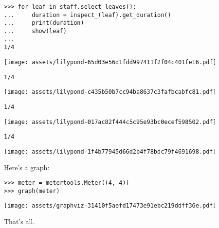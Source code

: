 \documentclass{article}
\begin{document}
\begin{lstlisting}
>>> for leaf in staff.select_leaves():
...     duration = inspect_(leaf).get_duration()
...     print(duration)
...     show(leaf)
...
1/4
\end{lstlisting}
\noindent\texttt{[image: assets/lilypond-65d03e56d1fdd997411f2f04c401fe16.pdf]}
\begin{lstlisting}
1/4
\end{lstlisting}
\noindent\texttt{[image: assets/lilypond-c435b50b7cc94ba8637c3fafbcabfc81.pdf]}
\begin{lstlisting}
1/4
\end{lstlisting}
\noindent\texttt{[image: assets/lilypond-017ac82f444c5c95e93bc0ecef598502.pdf]}
\begin{lstlisting}
1/4
\end{lstlisting}
\noindent\texttt{[image: assets/lilypond-1f4b77945d66d2b4f78bdc79f4691698.pdf]}

Here's a graph:

\begin{comment}
<abjad>
meter = metertools.Meter((4, 4))
graph(meter)
</abjad>
\end{comment}

\begin{lstlisting}
>>> meter = metertools.Meter((4, 4))
>>> graph(meter)
\end{lstlisting}
\noindent\texttt{[image: assets/graphviz-31410f5aefd17473e91ebc219ddff36e.pdf]}

That's all.
\end{document}

